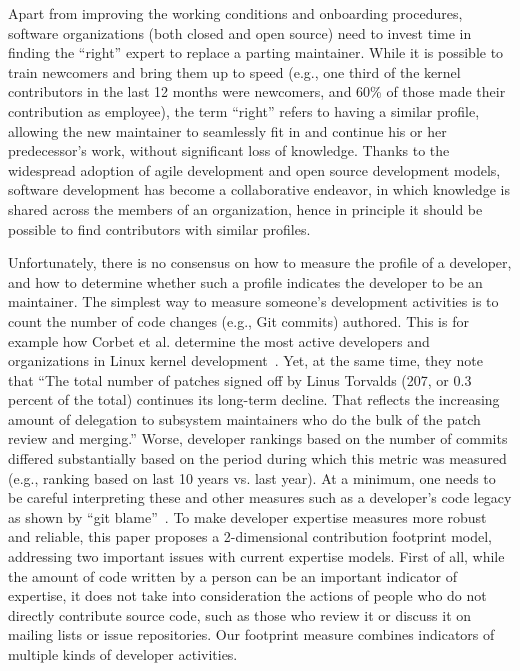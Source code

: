 Apart from improving the working conditions and onboarding procedures, software organizations (both closed and open source) need to invest time in finding the ``right'' expert to replace a parting maintainer. While it is possible to train newcomers and bring them up to speed (e.g., one third of the kernel contributors in the last 12 months were newcomers, and 60\% of those made their contribution as employee), the term ``right'' refers to having a similar profile, allowing the new maintainer to seamlessly fit in and continue his or her predecessor's work, without significant loss of knowledge. Thanks to the widespread adoption of agile development and open source development models, software development has become a collaborative endeavor, in which knowledge is shared across the members of an organization, hence in principle it should be possible to find contributors with similar profiles.

Unfortunately, there is no consensus on how to measure the profile of a developer, and how to determine whether such a profile indicates the developer to be an maintainer. The simplest way to measure someone's development activities is to count the number of code changes (e.g., Git commits) authored. This is for example how Corbet et al. determine the most active developers and organizations in Linux kernel development~\cite{corbet17}. Yet, at the same time, they note that ``The total number of patches signed off by Linus Torvalds (207, or 0.3 percent of the total) continues its long-term decline. That reflects the increasing amount of delegation to subsystem maintainers who do the bulk of the patch review and merging.'' Worse, developer rankings based on the number of commits differed substantially based on the period during which this metric was measured (e.g., ranking based on last 10 years vs. last year). At a minimum, one needs to be careful interpreting these and other measures such as a developer's code legacy as shown by ``git blame''~\cite{Bhattacharya, mockus02, McDonald, Fritz-2007}.
To make developer expertise measures more robust and reliable, this paper proposes a 2-dimensional contribution footprint model, addressing two important issues with current expertise models. First of all, while the amount of code written by a person can be an important indicator of expertise, 
it does not take into consideration the actions of people who do not directly contribute
source code, such as those who review it or discuss it on mailing lists or issue repositories. Our footprint measure combines indicators of multiple kinds of developer activities.

